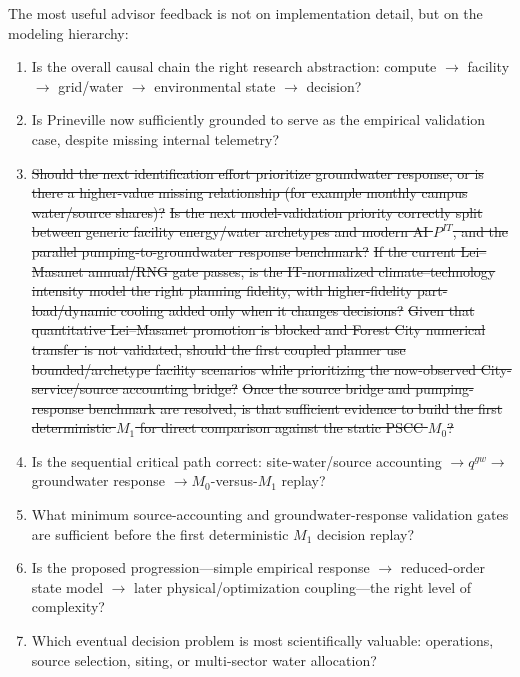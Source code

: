 \documentclass[11pt]{article}
\newcommand{\oldtxt}[1]{\textcolor{blue!70!black}{\sout{#1}}}
\newcommand{\latesttxt}[1]{\textcolor{purple!85!black}{#1}}
\begin{document}
The most useful advisor feedback is not on implementation detail, but on the modeling hierarchy:

\begin{enumerate}
\item Is the overall causal chain the right research abstraction: compute \(\rightarrow\) facility \(\rightarrow\) grid/water \(\rightarrow\) environmental state \(\rightarrow\) decision?
\item Is Prineville now sufficiently grounded to serve as the empirical validation case, despite missing internal telemetry?
\item \oldtxt{Should the next identification effort prioritize groundwater response, or is there a higher-value missing relationship (for example monthly campus water/source shares)?}
\oldtxt{Is the next model-validation priority correctly split between generic facility energy/water archetypes and modern AI \(P^{IT}\), and the parallel pumping-to-groundwater response benchmark?}
\oldtxt{If the current Lei--Masanet annual/RNG gate passes, is the IT-normalized climate--technology intensity model the right planning fidelity, with higher-fidelity part-load/dynamic cooling added only when it changes decisions?}
\oldtxt{Given that quantitative Lei--Masanet promotion is blocked and Forest City numerical transfer is not validated, should the first coupled planner use bounded/archetype facility scenarios while prioritizing the now-observed City-service/source accounting bridge?}
\oldtxt{Once the source bridge and pumping-response benchmark are resolved, is that sufficient evidence to build the first deterministic \(M_1\) for direct comparison against the static PSCC \(M_0\)?}
\item \latesttxt{Is the sequential critical path correct: site-water/source accounting \(\rightarrow q^{gw}\rightarrow\) groundwater response \(\rightarrow M_0\)-versus-\(M_1\) replay?}
\item \latesttxt{What minimum source-accounting and groundwater-response validation gates are sufficient before the first deterministic \(M_1\) decision replay?}
\item Is the proposed progression---simple empirical response \(\rightarrow\) reduced-order state model \(\rightarrow\) later physical/optimization coupling---the right level of complexity?
\item Which eventual decision problem is most scientifically valuable: operations, source selection, siting, or multi-sector water allocation?
\end{enumerate}
\end{document}

